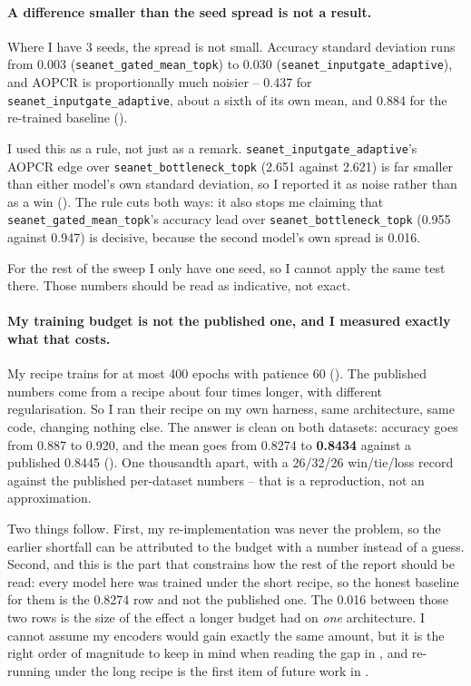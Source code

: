 \paragraph{A difference smaller than the seed spread is not a result.}
Where I have 3 seeds, the spread is not small. Accuracy standard deviation runs from 0.003
(\texttt{seanet\_gated\_mean\_topk}) to 0.030 (\texttt{seanet\_inputgate\_adaptive}), and AOPCR is
proportionally much noisier -- 0.437 for \texttt{seanet\_inputgate\_adaptive}, about a sixth of its
own mean, and 0.884 for the re-trained \millet{} baseline ().

I used this as a rule, not just as a remark. \texttt{seanet\_inputgate\_adaptive}'s AOPCR edge over
\texttt{seanet\_bottleneck\_topk} (2.651 against 2.621) is far smaller than either model's own
standard deviation, so I reported it as noise rather than as a win ().
The rule cuts both ways: it also stops me claiming that
\texttt{seanet\_gated\_mean\_topk}'s accuracy lead over \texttt{seanet\_bottleneck\_topk} (0.955
against 0.947) is decisive, because the second model's own spread is 0.016.

For the rest of the sweep I only have one seed, so I cannot apply the same test there. Those
numbers should be read as indicative, not exact.

\paragraph{My training budget is not the published one, and I measured exactly what that costs.}
My recipe trains for at most 400 epochs with patience 60 (). The published
\millet{} numbers come from a recipe about four times longer, with different regularisation. So I
ran their recipe on my own harness, same architecture, same code, changing nothing else. The answer
is clean on both datasets: \webtraffic{} accuracy goes from 0.887 to 0.920, and the \ucr{} mean goes
from 0.8274 to \textbf{0.8434} against a published 0.8445 (). One thousandth
apart, with a 26/32/26 win/tie/loss record against the published per-dataset numbers -- that is a
reproduction, not an approximation.

Two things follow. First, my re-implementation was never the problem, so the earlier shortfall can
be attributed to the budget with a number instead of a guess. Second, and this is the part that
constrains how the rest of the report should be read: every \seanet{} model here was trained under
the short recipe, so the honest baseline for them is the 0.8274 row and not the published one. The
0.016 between those two rows is the size of the effect a longer budget had on \emph{one}
architecture. I cannot assume my encoders would gain exactly the same amount, but it is the right
order of magnitude to keep in mind when reading the \ucr{} gap in , and re-running
\seanet{} under the long recipe is the first item of future work in .

